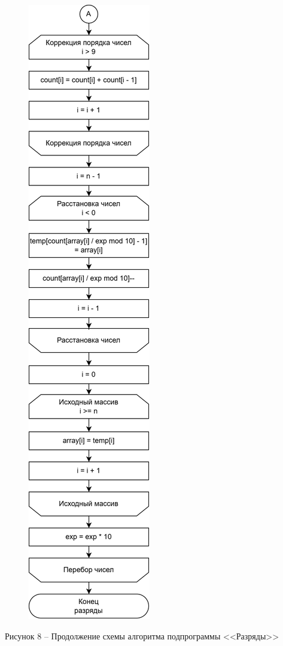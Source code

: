 \documentclass[a4paper,14pt]{extarticle}
\begin{document}
  \pagebreak
  \begin{figure}[h]
    \centering
    \includegraphics[width=0.23\linewidth]{images/s-2-4}
  \end{figure}
  \begin{center}
    Рисунок 8 – Продолжение схемы алгоритма подпрограммы <<Разряды>>
  \end{center}
\end{document}
